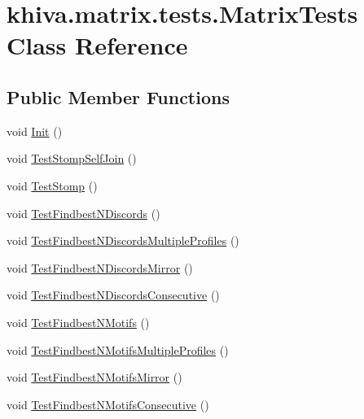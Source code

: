 \hypertarget{classkhiva_1_1matrix_1_1tests_1_1_matrix_tests}{}\section{khiva.\+matrix.\+tests.\+Matrix\+Tests Class Reference}
\label{classkhiva_1_1matrix_1_1tests_1_1_matrix_tests}
\subsection*{Public Member Functions}
\begin{DoxyCompactItemize}
\item 
void \mbox{\hyperlink{classkhiva_1_1matrix_1_1tests_1_1_matrix_tests_aa742f33f3d6368cb811b2a5e22191414}{Init}} ()
\item 
void \mbox{\hyperlink{classkhiva_1_1matrix_1_1tests_1_1_matrix_tests_aa0b35c45818a0adc9aa1d6fc44093a80}{Test\+Stomp\+Self\+Join}} ()
\item 
void \mbox{\hyperlink{classkhiva_1_1matrix_1_1tests_1_1_matrix_tests_a01d81245f9551d73740fd1d2abbbd134}{Test\+Stomp}} ()
\item 
void \mbox{\hyperlink{classkhiva_1_1matrix_1_1tests_1_1_matrix_tests_a916a2cedf018da205ae2270723f57684}{Test\+Findbest\+N\+Discords}} ()
\item 
void \mbox{\hyperlink{classkhiva_1_1matrix_1_1tests_1_1_matrix_tests_a12054222cd51bf9f8a3697a20e4daba7}{Test\+Findbest\+N\+Discords\+Multiple\+Profiles}} ()
\item 
void \mbox{\hyperlink{classkhiva_1_1matrix_1_1tests_1_1_matrix_tests_a51f1aa0530a44438b1185bb09d8c57a3}{Test\+Findbest\+N\+Discords\+Mirror}} ()
\item 
void \mbox{\hyperlink{classkhiva_1_1matrix_1_1tests_1_1_matrix_tests_a9eb578fe5a11fadcec5b0b1143aa8d0c}{Test\+Findbest\+N\+Discords\+Consecutive}} ()
\item 
void \mbox{\hyperlink{classkhiva_1_1matrix_1_1tests_1_1_matrix_tests_a67ac3f478060b74ed9e08507c51a23ac}{Test\+Findbest\+N\+Motifs}} ()
\item 
void \mbox{\hyperlink{classkhiva_1_1matrix_1_1tests_1_1_matrix_tests_a86eedf47f59021d466a27c3a87094b1e}{Test\+Findbest\+N\+Motifs\+Multiple\+Profiles}} ()
\item 
void \mbox{\hyperlink{classkhiva_1_1matrix_1_1tests_1_1_matrix_tests_a6faf01428462cebc27460f269b98d39a}{Test\+Findbest\+N\+Motifs\+Mirror}} ()
\item 
void \mbox{\hyperlink{classkhiva_1_1matrix_1_1tests_1_1_matrix_tests_a3e9c9a9efd657236ba30241251aa85fa}{Test\+Findbest\+N\+Motifs\+Consecutive}} ()
\end{DoxyCompactItemize}


